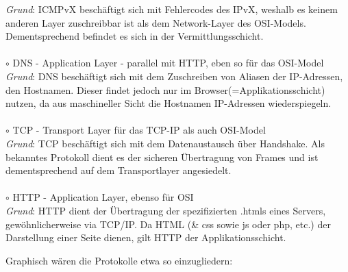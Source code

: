 \documentclass[11pt]{article}
\begin{document}
\begin{enumerate}[\thesection .1]
\begin{addmargin}[1em]{1em}
            \emph{Grund}: ICMPvX beschäftigt sich mit Fehlercodes des IPvX, weshalb es keinem anderen Layer zuschreibbar ist als dem Network-Layer des OSI-Models.
            Dementsprechend befindet es sich in der Vermittlungsschicht.\\\\
            $\circ$ DNS - Application Layer - parallel mit HTTP, eben so für das OSI-Model\\
            \emph{Grund}: DNS beschäftigt sich mit dem Zuschreiben von Aliasen der IP-Adressen, den Hostnamen.
            Dieser findet jedoch nur im Browser(=Applikationsschicht) nutzen, da aus maschineller Sicht die Hostnamen IP-Adressen wiederspiegeln.\\\\
            $\circ$ TCP - Transport Layer für das TCP-IP als auch OSI-Model\\
            \emph{Grund}: TCP beschäftigt sich mit dem Datenaustausch über Handshake. Als bekanntes Protokoll dient es der sicheren Übertragung von Frames
            und ist dementsprechend auf dem Transportlayer angesiedelt.\\\\
            $\circ$ HTTP - Application Layer, ebenso für OSI\\
            \emph{Grund}: HTTP dient der Übertragung der spezifizierten .htmls eines Servers, gewöhnlicherweise via TCP/IP.
            Da HTML (\& css sowie js oder php, etc.) der Darstellung einer Seite dienen, gilt HTTP der Applikationsschicht.
        \end{addmargin}
\pagebreak
        Graphisch wären die Protokolle etwa so einzugliedern:

        \noindent{}




    \end{enumerate}
\end{document}
